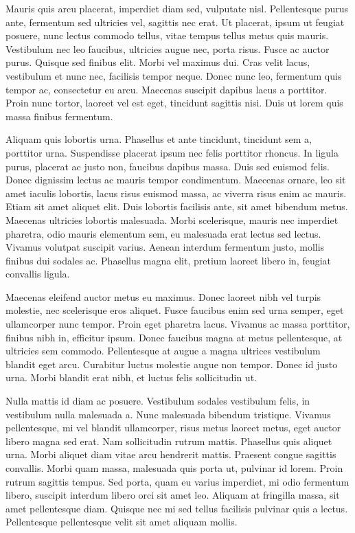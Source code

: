 Mauris quis arcu placerat, imperdiet diam sed, vulputate nisl. Pellentesque purus ante, fermentum sed ultricies vel, sagittis nec erat. Ut placerat, ipsum ut feugiat posuere, nunc lectus commodo tellus, vitae tempus tellus metus quis mauris. Vestibulum nec leo faucibus, ultricies augue nec, porta risus. Fusce ac auctor purus. Quisque sed finibus elit. Morbi vel maximus dui. Cras velit lacus, vestibulum et nunc nec, facilisis tempor neque. Donec nunc leo, fermentum quis tempor ac, consectetur eu arcu. Maecenas suscipit dapibus lacus a porttitor. Proin nunc tortor, laoreet vel est eget, tincidunt sagittis nisi. Duis ut lorem quis massa finibus fermentum.

Aliquam quis lobortis urna. Phasellus et ante tincidunt, tincidunt sem a, porttitor urna. Suspendisse placerat ipsum nec felis porttitor rhoncus. In ligula purus, placerat ac justo non, faucibus dapibus massa. Duis sed euismod felis. Donec dignissim lectus ac mauris tempor condimentum. Maecenas ornare, leo sit amet iaculis lobortis, lacus risus euismod massa, ac viverra risus enim ac mauris. Etiam sit amet aliquet elit. Duis lobortis facilisis ante, sit amet bibendum metus. Maecenas ultricies lobortis malesuada. Morbi scelerisque, mauris nec imperdiet pharetra, odio mauris elementum sem, eu malesuada erat lectus sed lectus. Vivamus volutpat suscipit varius. Aenean interdum fermentum justo, mollis finibus dui sodales ac. Phasellus magna elit, pretium laoreet libero in, feugiat convallis ligula.

Maecenas eleifend auctor metus eu maximus. Donec laoreet nibh vel turpis molestie, nec scelerisque eros aliquet. Fusce faucibus enim sed urna semper, eget ullamcorper nunc tempor. Proin eget pharetra lacus. Vivamus ac massa porttitor, finibus nibh in, efficitur ipsum. Donec faucibus magna at metus pellentesque, at ultricies sem commodo. Pellentesque at augue a magna ultrices vestibulum blandit eget arcu. Curabitur luctus molestie augue non tempor. Donec id justo urna. Morbi blandit erat nibh, et luctus felis sollicitudin ut.

Nulla mattis id diam ac posuere. Vestibulum sodales vestibulum felis, in vestibulum nulla malesuada a. Nunc malesuada bibendum tristique. Vivamus pellentesque, mi vel blandit ullamcorper, risus metus laoreet metus, eget auctor libero magna sed erat. Nam sollicitudin rutrum mattis. Phasellus quis aliquet urna. Morbi aliquet diam vitae arcu hendrerit mattis. Praesent congue sagittis convallis. Morbi quam massa, malesuada quis porta ut, pulvinar id lorem. Proin rutrum sagittis tempus. Sed porta, quam eu varius imperdiet, mi odio fermentum libero, suscipit interdum libero orci sit amet leo. Aliquam at fringilla massa, sit amet pellentesque diam. Quisque nec mi sed tellus facilisis pulvinar quis a lectus. Pellentesque pellentesque velit sit amet aliquam mollis.

